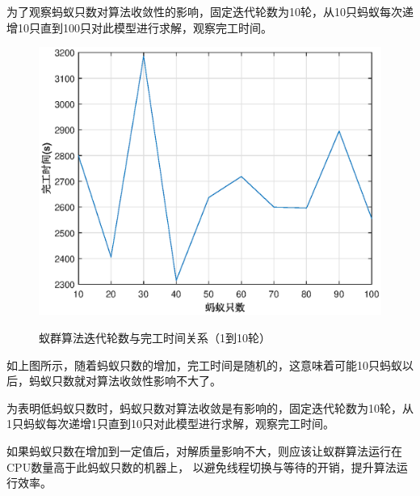 为了观察蚂蚁只数对算法收敛性的影响，固定迭代轮数为10轮，从10只蚂蚁每次递增10只直到100只对此模型进行求解，观察完工时间。

\begin{table}[H]
	\centering
	\caption{蚁群算法蚂蚁只数与完工时间的关系}
\end{table}

\begin{figure}[H]
	\centering
	\includegraphics[scale=1.00,angle=0]{figures/count_t.eps}\\
	\caption{蚁群算法迭代轮数与完工时间关系（1到10轮）}
\end{figure}

如上图所示，随着蚂蚁只数的增加，完工时间是随机的，这意味着可能10只蚂蚁以后，蚂蚁只数就对算法收敛性影响不大了。

为表明低蚂蚁只数时，蚂蚁只数对算法收敛是有影响的，固定迭代轮数为10轮，从1只蚂蚁每次递增1只直到10只对此模型进行求解，观察完工时间。

如果蚂蚁只数在增加到一定值后，对解质量影响不大，则应该让蚁群算法运行在CPU数量高于此蚂蚁只数的机器上，
以避免线程切换与等待的开销，提升算法运行效率。

